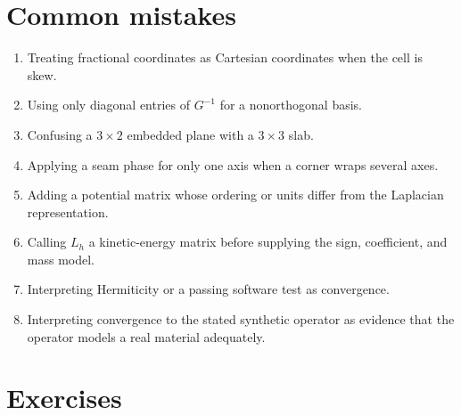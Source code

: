 \section{Common mistakes}

\begin{enumerate}
  \item Treating fractional coordinates as Cartesian coordinates when the cell
        is skew.
  \item Using only diagonal entries of $G^{-1}$ for a nonorthogonal basis.
  \item Confusing a $3\times2$ embedded plane with a $3\times3$ slab.
  \item Applying a seam phase for only one axis when a corner wraps several
        axes.
  \item Adding a potential matrix whose ordering or units differ from the
        Laplacian representation.
  \item Calling $L_h$ a kinetic-energy matrix before supplying the sign,
        coefficient, and mass model.
  \item Interpreting Hermiticity or a passing software test as convergence.
  \item Interpreting convergence to the stated synthetic operator as evidence
        that the operator models a real material adequately.
\end{enumerate}

\section{Exercises}

